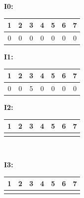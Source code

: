 \documentclass[12pt]{exam}
\begin{document}
\begin{questions}
    \par{{\bf I0:}
        \begin{tabular}{|c|c|c|c|c|c|c|}
            \multicolumn{1}{c}{1} & \multicolumn{1}{c}{2} &
            \multicolumn{1}{c}{3} & \multicolumn{1}{c}{4} &
            \multicolumn{1}{c}{5} & \multicolumn{1}{c}{6} &
            \multicolumn{1}{c}{7}
            \\ \hline
            0                     & 0                     & 0 & 0 & 0 & 0 & 0 \\
            \hline
        \end{tabular}}

    \par{{\bf I1:}
        \begin{tabular}{|c|c|c|c|c|c|c|}
            \multicolumn{1}{c}{1} & \multicolumn{1}{c}{2} &
            \multicolumn{1}{c}{3} & \multicolumn{1}{c}{4} &
            \multicolumn{1}{c}{5} & \multicolumn{1}{c}{6} &
            \multicolumn{1}{c}{7}
            \\ \hline
            0                     & 0                     & 5 & 0 & 0 & 0 & 0 \\
            \hline
        \end{tabular}}

    {{\bf I2:}
        \par{
            \begin{tabular}{|c|c|c|c|c|c|c|}
                \multicolumn{1}{c}{1} & \multicolumn{1}{c}{2} &
                \multicolumn{1}{c}{3} & \multicolumn{1}{c}{4} &
                \multicolumn{1}{c}{5} & \multicolumn{1}{c}{6} &
                \multicolumn{1}{c}{7}
                \\ \hline
                                      &                       &   &  &  &  & \\
                \hline
            \end{tabular}}}\\

    {{\bf I3:}
    \par{
        \begin{tabular}{|c|c|c|c|c|c|c|}
            \multicolumn{1}{c}{1} & \multicolumn{1}{c}{2} &
            \multicolumn{1}{c}{3} & \multicolumn{1}{c}{4} &
            \multicolumn{1}{c}{5} & \multicolumn{1}{c}{6} &
            \multicolumn{1}{c}{7}
            \\ \hline
                                  &                       &   &  &  &  & \\
            \hline
        \end{tabular}}}\\


\end{questions}
\end{document}
